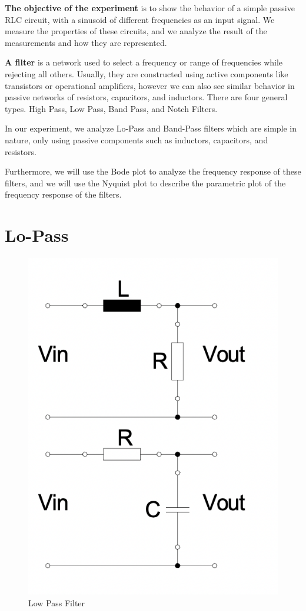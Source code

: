 \textbf{The objective of the experiment} is to show the behavior of a simple passive
RLC circuit, with a sinusoid of different frequencies as an input signal.
We measure the properties of these circuits, and we analyze the
result of the measurements and how they are represented.


\textbf{A filter} is a network used to select a frequency or range of frequencies while rejecting all others. Usually, they are constructed using active components like transistors or operational amplifiers, however we can also see similar behavior in passive networks of resistors,
capacitors, and inductors. There are four general types. High Pass, Low Pass, Band Pass, and Notch Filters.


In our experiment, we analyze Lo-Pass and Band-Pass filters which are simple in nature, only using passive components such as inductors, capacitors, and resistors.


Furthermore, we will use the Bode plot to analyze the frequency response of these filters, and we will use the Nyquist plot to describe the parametric plot of the frequency response of the filters.

\section{Lo-Pass}
\begin{figure}[H]
    \centering
    \includegraphics{images/figure_low_pass.png}
    \caption{Low Pass Filter}
\end{figure}


